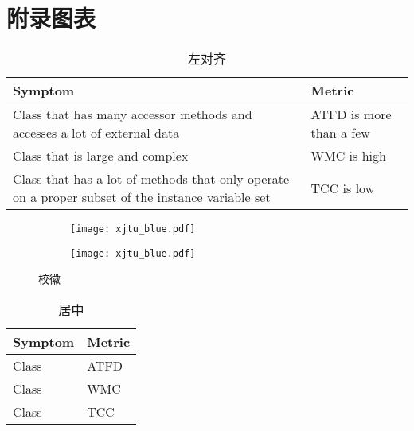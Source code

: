 \chapter{附录图表}

\begin{table}[H]
    \caption{左对齐}
    \begin{tabularx}{\textwidth}{XX}
    \toprule
        \textbf{Symptom} & \textbf{Metric} \\
    \midrule
        Class that has many accessor methods and accesses a lot of external data & ATFD is more than a few\\
        Class that is large and complex & WMC is high\\
        Class that has a lot of methods that only operate on a proper subset of the instance variable set & TCC is low\\
    \bottomrule
    \end{tabularx}
\end{table}

\begin{figure}[H]
    \begin{subfigure}[b]{0.49\linewidth}
        \centering
        \texttt{[image: xjtu\_blue.pdf]}
    \end{subfigure}
    \begin{subfigure}[b]{0.49\linewidth}
        \centering
        \texttt{[image: xjtu\_blue.pdf]}
        \label{subfig:icon}
    \end{subfigure}
    \caption{校徽}
\end{figure}


\begin{table}[H]
    \caption{居中}
    \begin{tabularx}{\textwidth}{YY}
    \toprule
        \textbf{Symptom} & \textbf{Metric} \\
    \midrule
        Class  & ATFD \\
        Class  & WMC \\
        Class  & TCC \\
    \bottomrule
    \end{tabularx}
\end{table}



